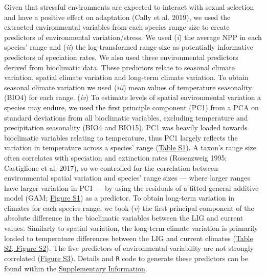 \documentclass[]{article}
\begin{document}
Given that stressful environments are expected to interact with sexual
selection and have a positive effect on adaptation (Cally et al. 2019),
we used the extracted environmental variables from each species range
size to create predictors of environmental variation/stress. We used
(\emph{i}) the average NPP in each species' range and (\emph{ii}) the
log-transformed range size as potentially informative predictors of
speciation rates. We also used three environmental predictors derived
from bioclimatic data. These predictors relate to seasonal climate
variation, spatial climate variation and long-term climate variation. To
obtain seasonal climate variation we used (\emph{iii}) mean values of
temperature seasonality (BIO4) for each range. (\emph{iv}) To estimate
levels of spatial environmental variation a species may endure, we used
the first principle component (PC1) from a PCA on standard deviations
from all bioclimatic variables, excluding temperature and precipitation
seasonality (BIO4 and BIO15). PC1 was heavily loaded towards bioclimatic
variables relating to temperature, thus PC1 largely reflects the
variation in temperature across a species' range
(\href{https://justincally.github.io/SexualSelection_Speciation/#generating_biologically_relevent_predictors}{Table S1}).
A taxon's range size often correlates with speciation and extinction
rates (Rosenzweig 1995; Castiglione et al. 2017), so we controlled for
the correlation between environmental spatial variation and species'
range sizes --- where larger ranges have larger variation in PC1 --- by
using the residuals of a fitted general additive model (GAM;
\href{https://justincally.github.io/SexualSelection_Speciation/#generating_biologically_relevent_predictors}{Figure S1})
as a predictor. To obtain long-term variation in climates for each
species range, we took (\emph{v}) the first principal component of the
absolute difference in the bioclimatic variables between the LIG and
current values. Similarly to spatial variation, the long-term climate
variation is primarily loaded to temperature differences between the LIG
and current climates
(\href{https://justincally.github.io/SexualSelection_Speciation/#long_term_climate_variability_(lig_anomaly)}{Table S2, Figure S2}).
The five predictors of environmental variability are not strongly
correlated
(\href{https://justincally.github.io/SexualSelection_Speciation/#correlations_between_environmental_predictors}{Figure S3}).
Details and \texttt{R} code to generate these predictors can be found
within the
\href{https://justincally.github.io/SexualSelection_Speciation/}{Supplementary Information}.
\end{document}
